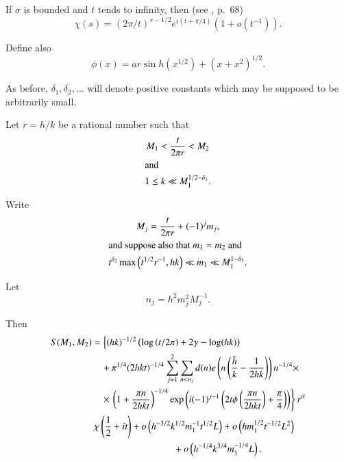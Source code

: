 If $\sigma$ is bounded and $t$ tends to infinity, then (see
\cite{key27}, p.~68)
\begin{equation}\label{chap4:eq4.1.5}
\chi(s) = \left(2\pi/t\right)^{s-1/2}e^{i(t+\pi/4)}\left(1+o\left(
t^{-1}\right)\right).
\end{equation}

Define also
\begin{equation}\label{chap4:eq4.1.6}
\phi(x)=ar\sin h \left(x^{1/2}\right)+\left(x+x^2\right)^{1/2}.
\end{equation}

As before, $\delta_1,\delta_2,\ldots$ will denote positive constants
which may be supposed to be arbitrarily small.

\begin{thm}\label{chap4:thm4.1}
Let $r=h/k$ be a rational number such that 
\begin{gather}
M_1<\frac{t}{2\pi r}<M_2\label{chap4:eq4.1.7}\\
\intertext{and}
1\leq k\ll M_1^{1/2-\delta_1}.\label{chap4:eq4.1.8}
\end{gather}

Write
\begin{gather}
M_j=\frac{t}{2\pi r}+(-1)^jm_j,\label{chap4:eq4.1.9}\\
\intertext{and suppose also that $m_1\asymp m_2$ and}
t^{\delta_2}\max\left(t^{1/2}r^{-1},hk\right)\ll m_1\ll
M_1^{1-\delta_3}.\label{chap4:eq4.1.10} 
\end{gather}

Let
\begin{equation}\label{chap4:eq4.1.11}
n_j=h^2m_j^2M_j^{-1}.
\end{equation}

Then\pageoriginale
\begin{align}
S(M_1,M_2) &= \left\{(hk)^{-1/2}\left(\log\left(t/2\pi\right)+2\gamma
-\log(hk)\right)\right.\label{chap4:eq4.1.12}\\
&\quad +\pi^{1/4}(2hkt)^{-1/4}\sum\limits_{j=1}^2\sum\limits_{n<n_j}
d(n)e\left(n\left(\frac{\bar{h}}{k}-\frac{1}{2hk}\right)\right)
n^{-1/4}\times\notag\\
&\quad\times\left.\left(1+\frac{\pi n}{2hkt}\right)^{-1/4}\exp\left(i
(-1)^{j-1}\left(2t\phi\left(\frac{\pi n}{2hkt}\right)+\frac{\pi}{4}
\right)\right)\right\}r^{it}\notag\\
& ~\chi\left(\frac{1}{2}+it\right)
+o\left(h^{-3/2}k^{1/2}m_1^{-1}t^{1/2}L\right)+o\left(
hm_1^{1/2}t^{-1/2}L^2\right)\notag\\
& \hspace{3cm} +o\left(h^{-1/4}k^{3/4}m_1^{-1/4}L \right).\notag 
\end{align}
\end{thm}

